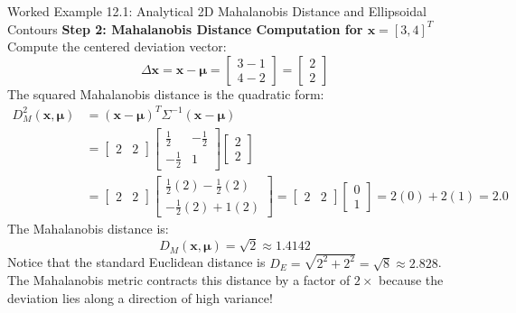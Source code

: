 \begin{examplebox}[breakable]{Worked Example 12.1: Analytical 2D Mahalanobis Distance and Ellipsoidal Contours}
\textbf{Step 2: Mahalanobis Distance Computation for $\mathbf{x} = [3, 4]^T$}
Compute the centered deviation vector:
\begin{equation}
\Delta \mathbf{x} = \mathbf{x} - \boldsymbol{\mu} = \begin{bmatrix} 3 - 1 \\ 4 - 2 \end{bmatrix} = \begin{bmatrix} 2 \\ 2 \end{bmatrix}
\end{equation}
The squared Mahalanobis distance is the quadratic form:
\begin{align}
D_M^2(\mathbf{x}, \boldsymbol{\mu}) &= (\mathbf{x} - \boldsymbol{\mu})^T \Sigma^{-1} (\mathbf{x} - \boldsymbol{\mu}) \nonumber \\
&= \begin{bmatrix} 2 & 2 \end{bmatrix} \begin{bmatrix} \frac{1}{2} & -\frac{1}{2} \\ -\frac{1}{2} & 1 \end{bmatrix} \begin{bmatrix} 2 \\ 2 \end{bmatrix} \nonumber \\
&= \begin{bmatrix} 2 & 2 \end{bmatrix} \begin{bmatrix} \frac{1}{2}(2) - \frac{1}{2}(2) \\ -\frac{1}{2}(2) + 1(2) \end{bmatrix} = \begin{bmatrix} 2 & 2 \end{bmatrix} \begin{bmatrix} 0 \\ 1 \end{bmatrix} = 2(0) + 2(1) = 2.0
\end{align}
The Mahalanobis distance is:
\begin{equation}
D_M(\mathbf{x}, \boldsymbol{\mu}) = \sqrt{2} \approx 1.4142
\end{equation}
Notice that the standard Euclidean distance is $D_E = \sqrt{2^2 + 2^2} = \sqrt{8} \approx 2.828$. The Mahalanobis metric contracts this distance by a factor of $2\times$ because the deviation lies along a direction of high variance!


\end{examplebox}
